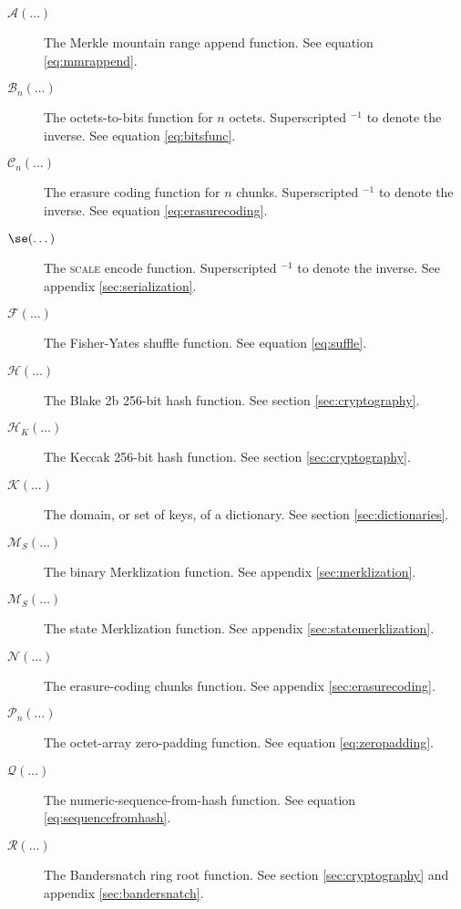 \begin{description}
  \item[$\mathcal{A}(\dots)$] The Merkle mountain range append function. See equation \ref{eq:mmrappend}.
  \item[$\mathcal{B}_n(\dots)$] The octets-to-bits function for $n$ octets. Superscripted ${}^{-1}$ to denote the inverse. See equation \ref{eq:bitsfunc}.
  \item[$\mathcal{C}_n(\dots)$] The erasure coding function for $n$ chunks. Superscripted ${}^{-1}$ to denote the inverse. See equation \ref{eq:erasurecoding}.
  \item[$\se(\dots)$] The \textsc{scale} encode function. Superscripted ${}^{-1}$ to denote the inverse. See appendix \ref{sec:serialization}.
  \item[$\mathcal{F}(\dots)$] The Fisher-Yates shuffle function. See equation \ref{eq:suffle}.
  \item[$\mathcal{H}(\dots)$] The Blake 2b 256-bit hash function. See section \ref{sec:cryptography}.
  \item[$\mathcal{H}_K(\dots)$] The Keccak 256-bit hash function. See section \ref{sec:cryptography}.
  \item[$\mathcal{K}(\dots)$] The domain, or set of keys, of a dictionary. See section \ref{sec:dictionaries}.
  \item[$\mathcal{M}_S(\dots)$] The binary Merklization function. See appendix \ref{sec:merklization}.
  \item[$\mathcal{M}_S(\dots)$] The state Merklization function. See appendix \ref{sec:statemerklization}.
  \item[$\mathcal{N}(\dots)$] The erasure-coding chunks function. See appendix \ref{sec:erasurecoding}.
  \item[$\mathcal{P}_n(\dots)$] The octet-array zero-padding function. See equation \ref{eq:zeropadding}.
  \item[$\mathcal{Q}(\dots)$] The numeric-sequence-from-hash function. See equation \ref{eq:sequencefromhash}.
  \item[$\mathcal{R}(\dots)$] The Bandersnatch ring root function. See section \ref{sec:cryptography} and appendix \ref{sec:bandersnatch}.

\end{description}
